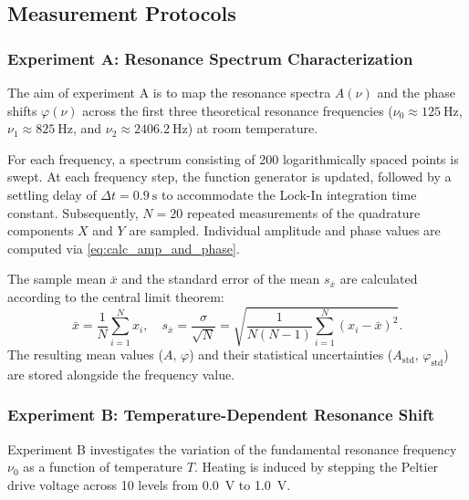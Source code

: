 \subsection{Measurement Protocols}

\subsubsection{Experiment A: Resonance Spectrum Characterization}
The aim of experiment A is to map the resonance spectra \( A(ν) \) and the phase shifts \( φ(ν) \) across the first three theoretical resonance frequencies (\( ν_0 \approx \qty{125}{\Hz} \), \( ν_1 \approx \qty{825}{\Hz} \), and \( ν_2 \approx \qty{2406.2}{\Hz} \)) at room temperature.

For each frequency, a spectrum consisting of 200 logarithmically spaced points is swept.
At each frequency step, the function generator is updated, followed by a settling delay of \( \Delta t = \qty{0.9}{\second} \) to accommodate the Lock-In integration time constant.
Subsequently, \( N = 20 \) repeated measurements of the quadrature components \( X \) and \( Y \) are sampled.
Individual amplitude and phase values are computed via \autoref{eq:calc_amp_and_phase}.

The sample mean \( \bar{x} \) and the standard error of the mean \( s_{\bar{x}} \) are calculated according to the central limit theorem:
\begin{equation}
    \bar{x} = \frac{1}{N} \sum_{i=1}^{N} x_i, \quad s_{\bar{x}} = \frac{\sigma}{\sqrt{N}} = \sqrt{\frac{1}{N(N-1)} \sum_{i=1}^{N} (x_i - \bar{x})^2}.
    \label{eq:sem}
\end{equation}
The resulting mean values (\( A \), \( φ \)) and their statistical uncertainties (\( A_{\text{std}} \), \( φ_{\text{std}} \)) are stored alongside the frequency value.

\subsubsection{Experiment B: Temperature-Dependent Resonance Shift}

Experiment B investigates the variation of the fundamental resonance frequency \( ν_0 \) as a function of temperature \( T \).
Heating is induced by stepping the Peltier drive voltage across 10 levels from \qty{0.0}{\volt} to \qty{1.0}{\volt}.

